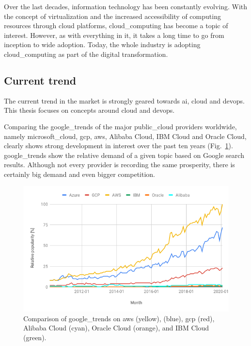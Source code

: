 \documentclass[../main.tex]{subfiles}
\begin{document}
    Over the last decades, information technology has been constantly evolving.
    With the concept of virtualization and the increased accessibility of computing resources through \gls{cloud} platforms, \gls{cloud_computing} has become a topic of interest.
    However, as with everything in \acrfull{it}, it takes a long time to go from inception to wide adoption.
    Today, the whole industry is adopting \gls{cloud_computing} as part of the digital transformation.

    \subsection{Current trend}
    \label{subsec:intro-trend}

    The current trend in the market is strongly geared towards \acrfull{ai}, \gls{cloud} and \gls{devops}.
    This thesis focuses on concepts around \gls{cloud} and \gls{devops}.

    Comparing the \gls{google_trends} of the major \gls{public_cloud} providers worldwide, namely \gls{microsoft_cloud}, \acrfull{gcp}, \acrfull{aws}, Alibaba Cloud, IBM Cloud and Oracle Cloud, clearly shows strong development in interest over the past ten years (Fig.~\ref{fig:cloud_trend_world}).
    \gls{google_trends} show the relative demand of a given topic based on Google search results.
    Although not every provider is recording the same prosperity, there is certainly big demand and even bigger competition.

    \begin{figure}[h]
        \centering
        \includegraphics[width=.8\linewidth]{img/intro_cloud_trend_world.png}
        \captionsetup{justification=centering}
        \caption{
        Comparison of \gls{google_trends} on \acrshort{aws} (yellow),  (blue), \acrshort{gcp} (red), Alibaba Cloud (cyan), Oracle Cloud (orange), and IBM Cloud (green).\cite{cloudtrend_world, cloudtrend_world_2}
        }
        \label{fig:cloud_trend_world}
    \end{figure}
\end{document}
